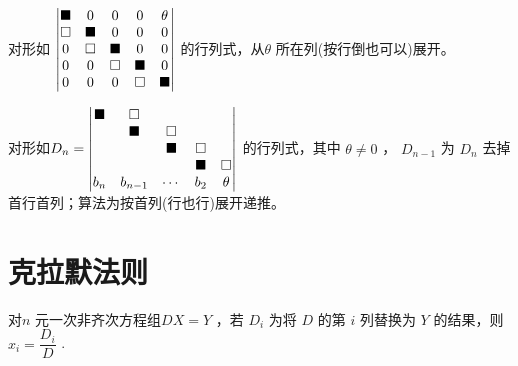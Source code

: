 
对形如 $ \begin{vmatrix}
    \blacksquare&0&0&0&\theta\\
    \square&\blacksquare&0&0&0\\
    0&\square&\blacksquare&0&0\\
    0&0&\square&\blacksquare&0\\
    0&0&0&\square&\blacksquare\\
\end{vmatrix} $ 的行列式，\nextline 从$ \theta $ 所在列(按行倒也可以)展开。


对形如$ D_n = \begin{vmatrix}
    \blacksquare&\square&&&\\ 
    &\blacksquare&\square&&\\ 
    &&\blacksquare&\square&\\ 
    &&&\blacksquare&\square\\
    b_n&b_{n-1}&\cdots&b_2&\theta
\end{vmatrix} $ 的行列式，其中 $ \theta \neq0 $ ，\nextline
$ D_{n-1} $ 为 $ D_n $ 去掉首行首列；算法为按首列(行也行)展开递推。

\section{克拉默法则}

对$ n $ 元一次非齐次方程组$ DX = Y $ ，若 $ D_i $ 为将 $ D $ 的第 $ i $ 列替换为 $ Y $ 的结果，则
$ x_i  = \dfrac{D_i}{D} $ .